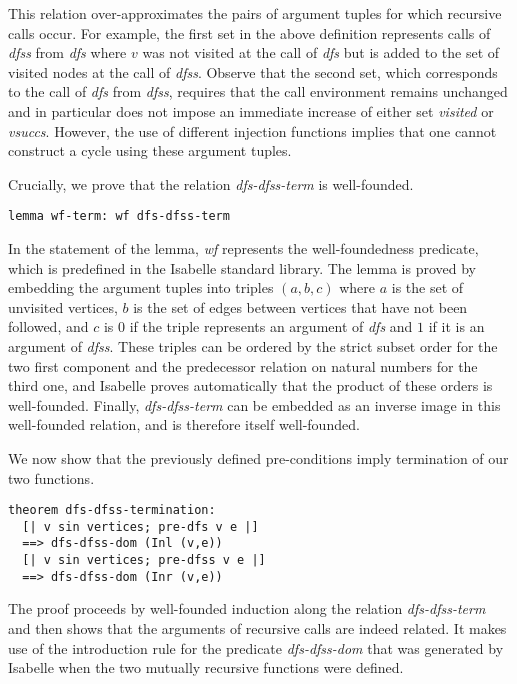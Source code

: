 \documentclass[sigplan,10pt,anonymous,review]{acmart}
\newcommand{\prog}[1]{\textit{#1}}
\begin{document}
This relation over-approximates the pairs of argument tuples for which recursive calls occur. For example, the first set in the above definition represents calls of \prog{dfss} from \prog{dfs} where $v$ was not visited at the call of \prog{dfs} but is added to the set of visited nodes at the call of \prog{dfss}. Observe that the second set, which corresponds to the call of \prog{dfs} from \prog{dfss}, requires that the call environment remains unchanged and in particular does not impose an immediate increase of either set \prog{visited} or \prog{vsuccs}. However, the use of different injection functions implies that one cannot construct a cycle using these argument tuples.

Crucially, we prove that the relation \prog{dfs-dfss-term} is well-founded.

\begin{small}
\begin{lstlisting}[language=isabelle]
lemma wf-term: wf dfs-dfss-term
\end{lstlisting}
\end{small}

In the statement of the lemma, \prog{wf} represents the well-foundedness predicate, which is predefined in the Isabelle standard library. The lemma is proved by embedding the argument tuples into triples $(a,b,c)$ where $a$ is the set of unvisited vertices, $b$ is the set of edges between vertices that have not been followed, and $c$ is $0$ if the triple represents an argument of \prog{dfs} and $1$ if it is an argument of \prog{dfss}. These triples can be ordered by the strict subset order for the two first component and the predecessor relation on natural numbers for the third one, and Isabelle proves automatically that the product of these orders is well-founded. Finally, \prog{dfs-dfss-term} can be embedded as an inverse image in this well-founded relation, and is therefore itself well-founded.

We now show that the previously defined pre-conditions imply termination of our two functions.

\begin{small}
\begin{lstlisting}[language=isabelle]
theorem dfs-dfss-termination:
  [| v sin vertices; pre-dfs v e |] 
  ==> dfs-dfss-dom (Inl (v,e))
  [| v sin vertices; pre-dfss v e |] 
  ==> dfs-dfss-dom (Inr (v,e))
\end{lstlisting}
\end{small}

The proof proceeds by well-founded induction along the relation \prog{dfs-dfss-term} and then shows that the arguments of recursive calls are indeed related. It makes use of the introduction rule for the predicate \prog{dfs-dfss-dom} that was generated by Isabelle when the two mutually recursive functions were defined.
\end{document}
